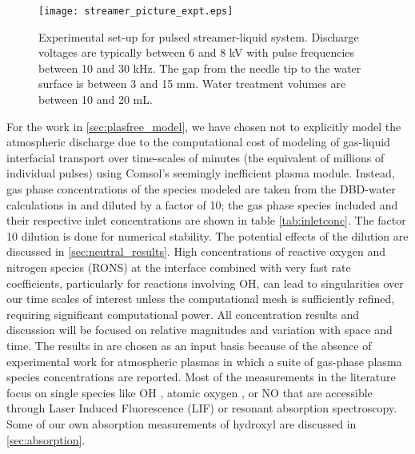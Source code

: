 \begin{figure}[htpb]
    \centering
        \texttt{[image: streamer\_picture\_expt.eps]}
    \caption{Experimental set-up for pulsed streamer-liquid system. Discharge voltages are typically between 6 and 8 kV with pulse frequencies between 10 and 30 kHz. The gap from the needle tip to the water surface is between 3 and 15 mm. Water treatment volumes are between 10 and 20 mL.}
    \label{fig:streamer_picture}
\end{figure}

For the work in \cref{sec:plasfree_model}, we have chosen not to explicitly model the atmospheric discharge due to the computational cost of modeling of gas-liquid interfacial transport over time-scales of minutes (the equivalent of millions of individual pulses) using Comsol's seemingly inefficient plasma module. Instead, gas phase concentrations of the species modeled are taken from the DBD-water calculations in \cite{Tian2014} and diluted by a factor of 10; the gas phase species included and their respective inlet concentrations are shown in table \ref{tab:inletconc}. The factor 10 dilution is done for numerical stability. The potential effects of the dilution are discussed in \cref{sec:neutral_results}. High concentrations of reactive oxygen and nitrogen species (RONS) at the interface combined with very fast rate coefficients, particularly for reactions involving OH, can lead to singularities over our time scales of interest unless the computational mesh is sufficiently refined, requiring significant computational power. All concentration results and discussion will be focused on relative magnitudes and variation with space and time. The results in \cite{Tian2014} are chosen as an input basis because of the absence of experimental work for atmospheric plasmas in which a suite of gas-phase plasma species concentrations are reported. Most of the measurements in the literature focus on single species like OH \cite{ono1998measurement,ono2001oh,nakagawa2011density,verreycken2012time}, atomic oxygen \cite{niemi2005absolute}, or NO \cite{kanazawa2003two} that are accessible through Laser Induced Fluorescence (LIF) or resonant absorption spectroscopy. \cite{hibert1999oh} Some of our own absorption measurements of hydroxyl are discussed in \cref{sec:absorption}.

